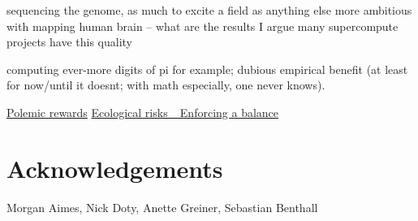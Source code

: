 \documentclass[sigconf]{acmart}
\begin{document}
sequencing the genome, as much to excite a field as anything else
more ambitious with mapping human brain -- what are the results
I argue many supercompute projects have this quality

computing ever-more digits of pi for example; dubious empirical benefit (at least for now/until it doesnt; with math especially, one never knows).

\uline{Polemic rewards}
\uline{Ecological risks
\_Enforcing a balance}


\section{Acknowledgements}
\label{sec:org16f850d}
Morgan Aimes, Nick Doty, Anette Greiner, Sebastian Benthall



\end{document}
